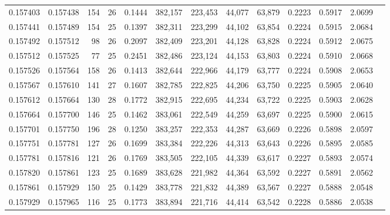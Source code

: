 \begin{tabular}{rrrrrrrrrrrrr}
0.157403 & 0.157438 & 154 &  26 &                                     0.1444 & 382,157 & 223,453 &  44,077 &  63,879 & 0.2223 & 0.5917 & 2.0699 \\
0.157441 & 0.157489 & 154 &  25 &                                     0.1397 & 382,311 & 223,299 &  44,102 &  63,854 & 0.2224 & 0.5915 & 2.0684 \\
0.157492 & 0.157512 &  98 &  26 &                                     0.2097 & 382,409 & 223,201 &  44,128 &  63,828 & 0.2224 & 0.5912 & 2.0675 \\
0.157512 & 0.157525 &  77 &  25 &                                     0.2451 & 382,486 & 223,124 &  44,153 &  63,803 & 0.2224 & 0.5910 & 2.0668 \\
0.157526 & 0.157564 & 158 &  26 &                                     0.1413 & 382,644 & 222,966 &  44,179 &  63,777 & 0.2224 & 0.5908 & 2.0653 \\
0.157567 & 0.157610 & 141 &  27 &                                     0.1607 & 382,785 & 222,825 &  44,206 &  63,750 & 0.2225 & 0.5905 & 2.0640 \\
0.157612 & 0.157664 & 130 &  28 &                                     0.1772 & 382,915 & 222,695 &  44,234 &  63,722 & 0.2225 & 0.5903 & 2.0628 \\
0.157664 & 0.157700 & 146 &  25 &                                     0.1462 & 383,061 & 222,549 &  44,259 &  63,697 & 0.2225 & 0.5900 & 2.0615 \\
0.157701 & 0.157750 & 196 &  28 &                                     0.1250 & 383,257 & 222,353 &  44,287 &  63,669 & 0.2226 & 0.5898 & 2.0597 \\
0.157751 & 0.157781 & 127 &  26 &                                     0.1699 & 383,384 & 222,226 &  44,313 &  63,643 & 0.2226 & 0.5895 & 2.0585 \\
0.157781 & 0.157816 & 121 &  26 &                                     0.1769 & 383,505 & 222,105 &  44,339 &  63,617 & 0.2227 & 0.5893 & 2.0574 \\
0.157820 & 0.157861 & 123 &  25 &                                     0.1689 & 383,628 & 221,982 &  44,364 &  63,592 & 0.2227 & 0.5891 & 2.0562 \\
0.157861 & 0.157929 & 150 &  25 &                                     0.1429 & 383,778 & 221,832 &  44,389 &  63,567 & 0.2227 & 0.5888 & 2.0548 \\
0.157929 & 0.157965 & 116 &  25 &                                     0.1773 & 383,894 & 221,716 &  44,414 &  63,542 & 0.2228 & 0.5886 & 2.0538 \\

\end{tabular}
